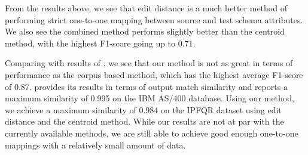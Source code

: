 \documentclass[conference]{IEEEtran}
\begin{document}
From the results above, we see that edit distance is a much better method of performing strict one-to-one mapping between source and test schema attributes. We also see the combined method performs slightly better than the centroid method, with the highest F1-score going up to 0.71. 

Comparing with results of \cite{ref4}, we see that our method is not as great in terms of performance as the corpus based method, which has the highest average F1-score of 0.87. \cite{ref1} provides its results in terms of output match similarity and reports a maximum similarity of 0.995 on the IBM AS/400 database. Using our method, we achieve a maximum similarity of 0.984 on the IPFQR dataset using edit distance and the centroid method. While our results are not at par with the currently available methods, we are still able to achieve good enough one-to-one mappings with a relatively small amount of data.
\end{document}
